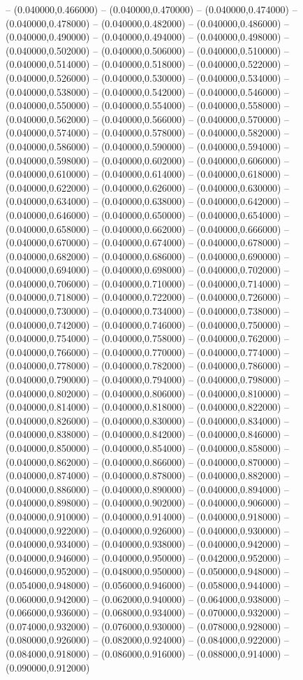 -- (0.040000,0.466000) -- (0.040000,0.470000) -- (0.040000,0.474000) -- (0.040000,0.478000) -- (0.040000,0.482000) -- (0.040000,0.486000) -- (0.040000,0.490000) -- (0.040000,0.494000) -- (0.040000,0.498000) -- (0.040000,0.502000) -- (0.040000,0.506000) -- (0.040000,0.510000) -- (0.040000,0.514000) -- (0.040000,0.518000) -- (0.040000,0.522000) -- (0.040000,0.526000) -- (0.040000,0.530000) -- (0.040000,0.534000) -- (0.040000,0.538000) -- (0.040000,0.542000) -- (0.040000,0.546000) -- (0.040000,0.550000) -- (0.040000,0.554000) -- (0.040000,0.558000) -- (0.040000,0.562000) -- (0.040000,0.566000) -- (0.040000,0.570000) -- (0.040000,0.574000) -- (0.040000,0.578000) -- (0.040000,0.582000) -- (0.040000,0.586000) -- (0.040000,0.590000) -- (0.040000,0.594000) -- (0.040000,0.598000) -- (0.040000,0.602000) -- (0.040000,0.606000) -- (0.040000,0.610000) -- (0.040000,0.614000) -- (0.040000,0.618000) -- (0.040000,0.622000) -- (0.040000,0.626000) -- (0.040000,0.630000) -- (0.040000,0.634000) -- (0.040000,0.638000) -- (0.040000,0.642000) -- (0.040000,0.646000) -- (0.040000,0.650000) -- (0.040000,0.654000) -- (0.040000,0.658000) -- (0.040000,0.662000) -- (0.040000,0.666000) -- (0.040000,0.670000) -- (0.040000,0.674000) -- (0.040000,0.678000) -- (0.040000,0.682000) -- (0.040000,0.686000) -- (0.040000,0.690000) -- (0.040000,0.694000) -- (0.040000,0.698000) -- (0.040000,0.702000) -- (0.040000,0.706000) -- (0.040000,0.710000) -- (0.040000,0.714000) -- (0.040000,0.718000) -- (0.040000,0.722000) -- (0.040000,0.726000) -- (0.040000,0.730000) -- (0.040000,0.734000) -- (0.040000,0.738000) -- (0.040000,0.742000) -- (0.040000,0.746000) -- (0.040000,0.750000) -- (0.040000,0.754000) -- (0.040000,0.758000) -- (0.040000,0.762000) -- (0.040000,0.766000) -- (0.040000,0.770000) -- (0.040000,0.774000) -- (0.040000,0.778000) -- (0.040000,0.782000) -- (0.040000,0.786000) -- (0.040000,0.790000) -- (0.040000,0.794000) -- (0.040000,0.798000) -- (0.040000,0.802000) -- (0.040000,0.806000) -- (0.040000,0.810000) -- (0.040000,0.814000) -- (0.040000,0.818000) -- (0.040000,0.822000) -- (0.040000,0.826000) -- (0.040000,0.830000) -- (0.040000,0.834000) -- (0.040000,0.838000) -- (0.040000,0.842000) -- (0.040000,0.846000) -- (0.040000,0.850000) -- (0.040000,0.854000) -- (0.040000,0.858000) -- (0.040000,0.862000) -- (0.040000,0.866000) -- (0.040000,0.870000) -- (0.040000,0.874000) -- (0.040000,0.878000) -- (0.040000,0.882000) -- (0.040000,0.886000) -- (0.040000,0.890000) -- (0.040000,0.894000) -- (0.040000,0.898000) -- (0.040000,0.902000) -- (0.040000,0.906000) -- (0.040000,0.910000) -- (0.040000,0.914000) -- (0.040000,0.918000) -- (0.040000,0.922000) -- (0.040000,0.926000) -- (0.040000,0.930000) -- (0.040000,0.934000) -- (0.040000,0.938000) -- (0.040000,0.942000) -- (0.040000,0.946000) -- (0.040000,0.950000) -- (0.042000,0.952000) -- (0.046000,0.952000) -- (0.048000,0.950000) -- (0.050000,0.948000) -- (0.054000,0.948000) -- (0.056000,0.946000) -- (0.058000,0.944000) -- (0.060000,0.942000) -- (0.062000,0.940000) -- (0.064000,0.938000) -- (0.066000,0.936000) -- (0.068000,0.934000) -- (0.070000,0.932000) -- (0.074000,0.932000) -- (0.076000,0.930000) -- (0.078000,0.928000) -- (0.080000,0.926000) -- (0.082000,0.924000) -- (0.084000,0.922000) -- (0.084000,0.918000) -- (0.086000,0.916000) -- (0.088000,0.914000) -- (0.090000,0.912000) 